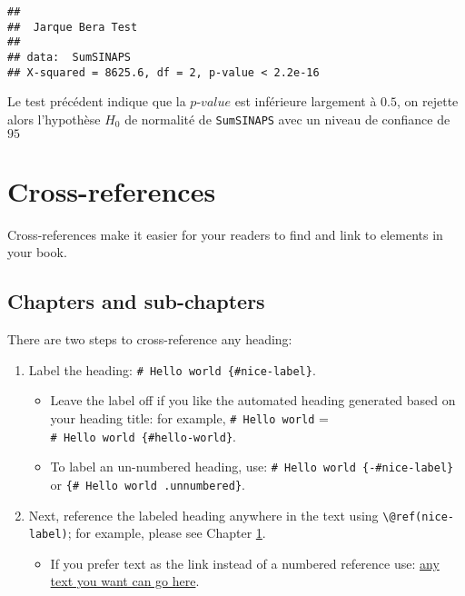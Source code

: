 \documentclass[
]{book}
\providecommand{\tightlist}{%
  \setlength{\itemsep}{0pt}\setlength{\parskip}{0pt}}
\theoremstyle{definition}
\theoremstyle{definition}
\theoremstyle{definition}
\theoremstyle{definition}
\theoremstyle{remark}
\begin{document}
\begin{verbatim}
## 
##  Jarque Bera Test
## 
## data:  SumSINAPS
## X-squared = 8625.6, df = 2, p-value < 2.2e-16
\end{verbatim}

Le test précédent indique que la \(p\)-\(value\) est inférieure largement à \(0.5\), on rejette alors l'hypothèse \(H_0\) de normalité de \texttt{SumSINAPS} avec un niveau de confiance de \(95%
\)

\hypertarget{cross}{%
\chapter{Cross-references}\label{cross}}

Cross-references make it easier for your readers to find and link to elements in your book.

\hypertarget{chapters-and-sub-chapters}{%
\section{Chapters and sub-chapters}\label{chapters-and-sub-chapters}}

There are two steps to cross-reference any heading:

\begin{enumerate}
\def\labelenumi{\arabic{enumi}.}
\tightlist
\item
  Label the heading: \texttt{\#\ Hello\ world\ \{\#nice-label\}}.

  \begin{itemize}
  \tightlist
  \item
    Leave the label off if you like the automated heading generated based on your heading title: for example, \texttt{\#\ Hello\ world} = \texttt{\#\ Hello\ world\ \{\#hello-world\}}.
  \item
    To label an un-numbered heading, use: \texttt{\#\ Hello\ world\ \{-\#nice-label\}} or \texttt{\{\#\ Hello\ world\ .unnumbered\}}.
  \end{itemize}
\item
  Next, reference the labeled heading anywhere in the text using \texttt{\textbackslash{}@ref(nice-label)}; for example, please see Chapter \ref{cross}.

  \begin{itemize}
  \tightlist
  \item
    If you prefer text as the link instead of a numbered reference use: \protect\hyperlink{cross}{any text you want can go here}.
  \end{itemize}
\end{enumerate}
\end{document}
